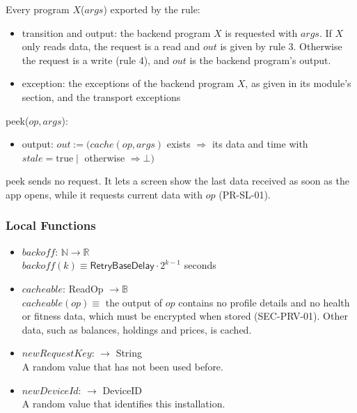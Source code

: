 \documentclass[12pt, titlepage]{article}
\begin{document}
\noindent Every program $X$($\mathit{args}$) exported by the rule:
\begin{itemize}
\item transition and output: the backend program $X$ is requested with
  $\mathit{args}$. If $X$ only reads data, the request is a read and
  $\mathit{out}$ is given by rule 3. Otherwise the request is a write
  (rule 4), and $\mathit{out}$ is the backend program's output.
\item exception: the exceptions of the backend program $X$, as given in its
  module's section, and the transport exceptions
\end{itemize}

\noindent peek($\mathit{op}, \mathit{args}$):
\begin{itemize}
\item output: $\mathit{out} := (\mathit{cache}(\mathit{op},
  \mathit{args})$ exists $\Rightarrow$ its data and time with $\mathit{stale}
  = \mathrm{true} \mid$ otherwise $\Rightarrow \bot)$
\end{itemize}

\noindent peek sends no request. It lets a screen show the last data
received as soon as the app opens, while it requests current data with
$\mathit{op}$ (PR-SL-01).

\subsubsection{Local Functions}

\begin{itemize}
\item $\mathit{backoff}$: $\mathbb{N} \rightarrow \mathbb{R}$\\
  $\mathit{backoff}(k) \equiv \textsf{RetryBaseDelay} \cdot 2^{k-1}$
  seconds
\item $\mathit{cacheable}$: ReadOp $\rightarrow \mathbb{B}$\\
  $\mathit{cacheable}(\mathit{op}) \equiv$ the output of $\mathit{op}$
  contains no profile details and no health or fitness data, which must be
  encrypted when stored (SEC-PRV-01). Other data, such as balances, holdings
  and prices, is cached.
\item $\mathit{newRequestKey}$: $\rightarrow$ String\\
  A random value that has not been used before.
\item $\mathit{newDeviceId}$: $\rightarrow$ DeviceID\\
  A random value that identifies this installation.
\end{itemize}
\end{document}
